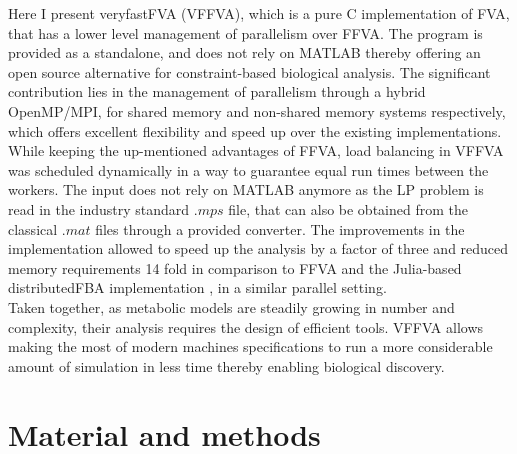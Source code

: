 Here I present veryfastFVA (VFFVA), which is a pure C implementation of FVA, that has a lower level management of parallelism over FFVA. The program is provided as a standalone, and does not rely on MATLAB thereby offering an open source alternative for constraint-based biological analysis. The significant contribution lies in the management of parallelism through a hybrid OpenMP/MPI, for shared memory and non-shared memory systems respectively, which offers excellent flexibility and speed up over the existing implementations. While keeping the up-mentioned advantages of FFVA, load balancing in VFFVA was scheduled dynamically \cite{suss2008common} in a way to guarantee equal run times between the workers. The input does not rely on MATLAB anymore as the LP problem is read in the industry standard $.mps$ file, that can also be obtained from the classical $.mat$ files through a provided converter. The improvements in the implementation allowed to speed up the analysis by a factor of three and reduced memory requirements 14 fold in comparison to FFVA and the Julia-based distributedFBA implementation \cite{heirendt2016distributedfba}, in a similar parallel setting.\\
Taken together, as metabolic models are steadily growing in number and complexity, their analysis requires the design of efficient tools. VFFVA allows making the most of modern machines specifications to run a more considerable amount of simulation in less time thereby enabling biological discovery. 
\section*{Material and methods}
